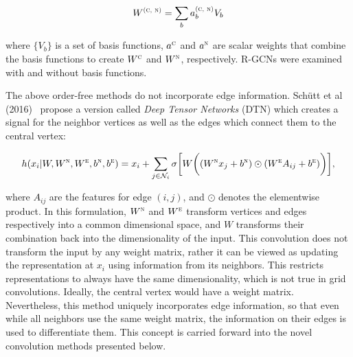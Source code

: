 \begin{equation}
W^\textsc{(c, n)} = \sum_{b} a^\textsc{(c, n)}_b V_b 
\label{eq:rgcn_basis}
\end{equation}

\noindent
where $\{V_b\}$ is a set of basis functions, $a^\textsc{c}$ and $a^\textsc{n}$ are scalar weights that combine the basis functions to create $W^\textsc{c}$ and $W^\textsc{n}$, respectively.
R-GCNs were examined with and without basis functions.

The above order-free methods do not incorporate edge information.
Sch{\"u}tt et al (2016)~\cite{schutt2017} propose a version called \emph{Deep Tensor Networks} (DTN) which creates a signal for the neighbor vertices as well as the edges which connect them to the central vertex:

\begin{equation}
h(x_i | W, W^\textsc{n}, W^\textsc{e}, b^\textsc{n}, b^\textsc{e})= x_i + \sum_{j \in \mathcal{N}_i} \sigma \bigg[ W \bigg( (W^\textsc{n} x_j + b^\textsc{n}) \odot (W^\textsc{e} A_{ij} + b^\textsc{e}) \bigg) \bigg],
\label{eq:deep_tensor}
\end{equation}

\noindent
where $A_{ij}$ are the features for edge $(i, j)$, and $\odot$ denotes the elementwise product.
In this formulation, $W^\textsc{n}$ and $W^\textsc{e}$ transform vertices and edges respectively into a common dimensional space, and $W$ transforms their combination back into the dimensionality of the input. 
This convolution does not transform the input by any weight matrix, rather it can be viewed as updating the representation at $x_i$ using information from its neighbors.
This restricts representations to always have the same dimensionality, which is not true in grid convolutions. 
Ideally, the central vertex would have a weight matrix.
Nevertheless, this method uniquely incorporates edge information, so that even while all neighbors use the same weight matrix, the information on their edges is used to differentiate them.
This concept is carried forward into the novel convolution methods presented below.


